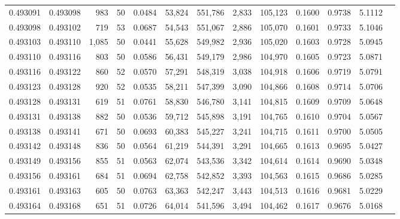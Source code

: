 \begin{tabular}{rrrrrrrrrrrrr}
0.493091 & 0.493098 &   983 &  50 &                                     0.0484 &  53,824 & 551,786 &   2,833 & 105,123 & 0.1600 & 0.9738 & 5.1112 \\
0.493098 & 0.493102 &   719 &  53 &                                     0.0687 &  54,543 & 551,067 &   2,886 & 105,070 & 0.1601 & 0.9733 & 5.1046 \\
0.493103 & 0.493110 & 1,085 &  50 &                                     0.0441 &  55,628 & 549,982 &   2,936 & 105,020 & 0.1603 & 0.9728 & 5.0945 \\
0.493110 & 0.493116 &   803 &  50 &                                     0.0586 &  56,431 & 549,179 &   2,986 & 104,970 & 0.1605 & 0.9723 & 5.0871 \\
0.493116 & 0.493122 &   860 &  52 &                                     0.0570 &  57,291 & 548,319 &   3,038 & 104,918 & 0.1606 & 0.9719 & 5.0791 \\
0.493123 & 0.493128 &   920 &  52 &                                     0.0535 &  58,211 & 547,399 &   3,090 & 104,866 & 0.1608 & 0.9714 & 5.0706 \\
0.493128 & 0.493131 &   619 &  51 &                                     0.0761 &  58,830 & 546,780 &   3,141 & 104,815 & 0.1609 & 0.9709 & 5.0648 \\
0.493131 & 0.493138 &   882 &  50 &                                     0.0536 &  59,712 & 545,898 &   3,191 & 104,765 & 0.1610 & 0.9704 & 5.0567 \\
0.493138 & 0.493141 &   671 &  50 &                                     0.0693 &  60,383 & 545,227 &   3,241 & 104,715 & 0.1611 & 0.9700 & 5.0505 \\
0.493142 & 0.493148 &   836 &  50 &                                     0.0564 &  61,219 & 544,391 &   3,291 & 104,665 & 0.1613 & 0.9695 & 5.0427 \\
0.493149 & 0.493156 &   855 &  51 &                                     0.0563 &  62,074 & 543,536 &   3,342 & 104,614 & 0.1614 & 0.9690 & 5.0348 \\
0.493156 & 0.493161 &   684 &  51 &                                     0.0694 &  62,758 & 542,852 &   3,393 & 104,563 & 0.1615 & 0.9686 & 5.0285 \\
0.493161 & 0.493163 &   605 &  50 &                                     0.0763 &  63,363 & 542,247 &   3,443 & 104,513 & 0.1616 & 0.9681 & 5.0229 \\
0.493164 & 0.493168 &   651 &  51 &                                     0.0726 &  64,014 & 541,596 &   3,494 & 104,462 & 0.1617 & 0.9676 & 5.0168 \\

\end{tabular}

